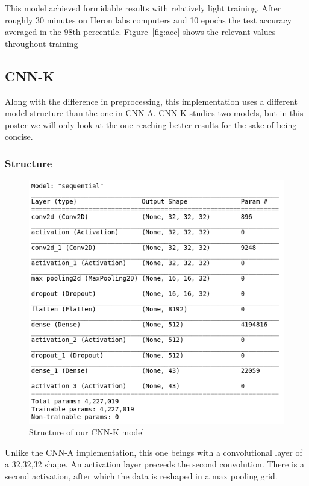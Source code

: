 \documentclass[12pt, landscape]{article}
\begin{document}
\begin{multicols}{3}
This model achieved formidable results with relatively light training. After
roughly 30 minutes on Heron labs computers and 10 epochs the test accuracy
averaged in the 98th percentile. Figure~\ref{fig:acc} shows the relevant values
throughout training

\subsection{CNN-K}
Along with the difference in preprocessing, this implementation uses a different
model structure than the one in CNN-A. CNN-K studies two models, but in this
poster we will only look at the one reaching better results for the sake of
being concise.

\subsubsection{Structure}
\begin{figure}[H]
    \centerline{\includegraphics[scale = 0.5]{figuremodel1.png}}
    \caption{Structure of our CNN-K model}
    \label{fig:figuremodel1}
\end{figure}
Unlike the CNN-A implementation, this one beings with a convolutional layer of a
32,32,32 shape. An activation layer preceeds the second convolution. There is a
second activation, after which the data is reshaped in a max pooling grid.


\end{multicols}
\end{document}
